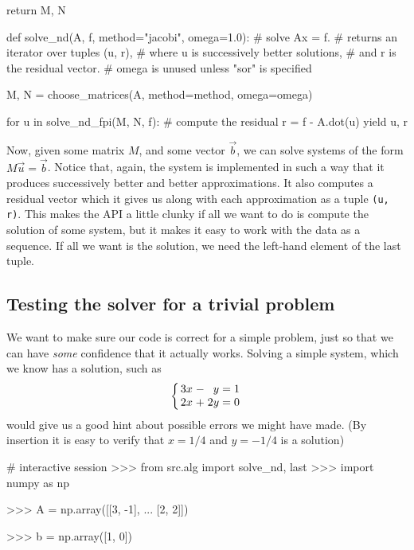 \documentclass[12pt]{article}
\begin{document}
\begin{multicols*}{2}
\begin{python}[
        caption={Argument-``parser'' and choice of $M$, $N$.}
    ]
    return M, N


def solve_nd(A, f, method="jacobi", omega=1.0):
    # solve Ax = f.
    # returns an iterator over tuples (u, r),
    # where u is successively better solutions,
    # and r is the residual vector.
    # omega is unused unless "sor" is specified

    M, N = choose_matrices(A,
                           method=method,
                           omega=omega)

    for u in solve_nd_fpi(M, N, f):
        # compute the residual
        r = f - A.dot(u)
        yield u, r
    \end{python}
    Now, given some matrix $M$, and some vector $\vec b$,
    we can solve systems of the form $M\vec u = \vec b$.
    Notice that, again, the system is implemented in such a way that it
    produces successively better and better approximations.
    It also computes a residual vector which it gives us along with
    each approximation as a tuple {\tt (u, r)}.
    This makes the API a little clunky if all we want to do is
    compute the solution of some system, but it makes it easy to
    work with the data as a sequence.
    If all we want is the solution, we need the left-hand element of
    the last tuple.

    \subsection*{Testing the solver for a trivial problem}
    We want to make sure our code is correct for a simple problem,
    just so that we can have {\em some} confidence that it actually
    works.
    Solving a simple system, which we know has a solution,
    such as
    \[
        \arraycolsep=1.4pt\def\arraystretch{1}
        \left\{\begin{array}{rcrcr}
            3x &-&  y &=&  1 \\
            2x &+& 2y &=&  0 \\
        \end{array}\right.
    \]
    would give us a good hint about possible errors we might have made.
    (By insertion it is easy to verify that $x = 1/4$ and $y = -1/4$ is a solution)
    \begin{python}
# interactive session
>>> from src.alg import solve_nd, last
>>> import numpy as np

>>> A = np.array([[3, -1],
...               [2,  2]])

>>> b = np.array([1, 0])


\end{python}
\end{multicols*}
\end{document}
